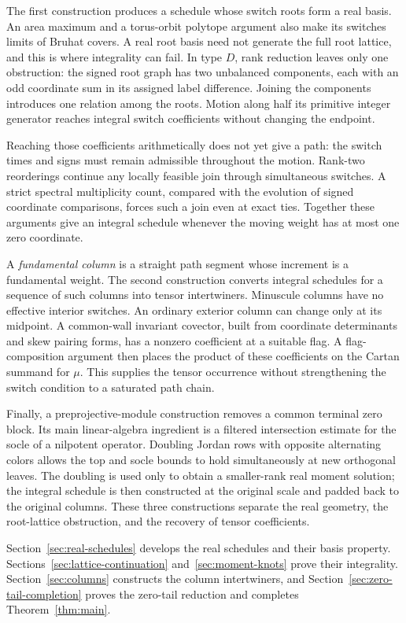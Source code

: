 The first construction produces a schedule whose switch roots form a
real basis. An area maximum and a torus-orbit polytope argument also
make its switches limits of Bruhat covers. A real root basis need not
generate the full root lattice, and this is where integrality can fail.
In type $D$, rank reduction leaves only one obstruction: the signed
root graph has two unbalanced components, each with an odd coordinate
sum in its assigned label difference. Joining the components introduces
one relation among the roots. Motion along half its primitive integer
generator reaches integral switch coefficients without changing the
endpoint.

Reaching those coefficients arithmetically does not yet give a path:
the switch times and signs must remain admissible throughout the motion.
Rank-two reorderings continue any locally feasible join through
simultaneous switches. A strict spectral multiplicity count, compared
with the evolution of signed coordinate comparisons, forces such a
join even at exact ties. Together these arguments give an integral
schedule whenever the moving weight has at most one zero coordinate.

A \emph{fundamental column} is a straight path segment whose increment
is a fundamental weight. The second construction converts integral
schedules for a sequence of such columns into tensor intertwiners. Minuscule columns have no
effective interior switches. An ordinary exterior column can change
only at its midpoint. A common-wall invariant covector, built from
coordinate determinants and skew pairing forms, has a nonzero
coefficient at a suitable flag. A flag-composition argument then
places the product of these coefficients on the Cartan summand for
$\mu$. This supplies the tensor occurrence without strengthening the
switch condition to a saturated path chain.

Finally, a preprojective-module construction removes a common terminal
zero block. Its main linear-algebra ingredient is a filtered
intersection estimate for the socle of a nilpotent operator. Doubling
Jordan rows with opposite alternating colors allows the top and socle
bounds to hold simultaneously at new orthogonal leaves. The doubling
is used only to obtain a smaller-rank real moment solution; the
integral schedule is then constructed at the original scale and padded
back to the original columns. These three constructions separate the
real geometry, the root-lattice obstruction, and the recovery of tensor
coefficients.

Section~\ref{sec:real-schedules} develops the real schedules and their
basis property. Sections~\ref{sec:lattice-continuation}
and~\ref{sec:moment-knots} prove their integrality.
Section~\ref{sec:columns} constructs the column intertwiners, and
Section~\ref{sec:zero-tail-completion} proves the zero-tail reduction
and completes Theorem~\ref{thm:main}.
